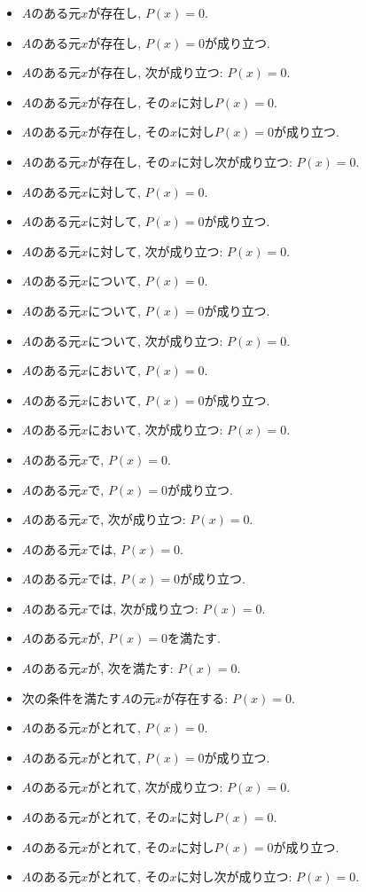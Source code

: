 \documentclass[a4paper,12pt,draft]{amsart}
\begin{document}
\begin{itemize}
\item $A$のある元$x$が存在し, $P(x)=0$.
\item $A$のある元$x$が存在し, $P(x)=0$が成り立つ.
\item $A$のある元$x$が存在し, 次が成り立つ: $P(x)=0$.
\item $A$のある元$x$が存在し, その$x$に対し$P(x)=0$.
\item $A$のある元$x$が存在し, その$x$に対し$P(x)=0$が成り立つ.
\item $A$のある元$x$が存在し, その$x$に対し次が成り立つ: $P(x)=0$.
\item $A$のある元$x$に対して, $P(x)=0$.
\item $A$のある元$x$に対して, $P(x)=0$が成り立つ.
\item $A$のある元$x$に対して, 次が成り立つ: $P(x)=0$.
\item $A$のある元$x$について, $P(x)=0$.
\item $A$のある元$x$について, $P(x)=0$が成り立つ.
\item $A$のある元$x$について, 次が成り立つ: $P(x)=0$.
\item $A$のある元$x$において, $P(x)=0$.
\item $A$のある元$x$において, $P(x)=0$が成り立つ.
\item $A$のある元$x$において, 次が成り立つ: $P(x)=0$.
\item $A$のある元$x$で, $P(x)=0$.
\item $A$のある元$x$で, $P(x)=0$が成り立つ.
\item $A$のある元$x$で, 次が成り立つ: $P(x)=0$.
\item $A$のある元$x$では, $P(x)=0$.
\item $A$のある元$x$では, $P(x)=0$が成り立つ.
\item $A$のある元$x$では, 次が成り立つ: $P(x)=0$.
\item $A$のある元$x$が, $P(x)=0$を満たす.
\item $A$のある元$x$が, 次を満たす: $P(x)=0$.
\item 次の条件を満たす$A$の元$x$が存在する: $P(x)=0$.
\item $A$のある元$x$がとれて, $P(x)=0$.
\item $A$のある元$x$がとれて, $P(x)=0$が成り立つ.
\item $A$のある元$x$がとれて, 次が成り立つ: $P(x)=0$.
\item $A$のある元$x$がとれて, その$x$に対し$P(x)=0$.
\item $A$のある元$x$がとれて, その$x$に対し$P(x)=0$が成り立つ.
\item $A$のある元$x$がとれて, その$x$に対し次が成り立つ: $P(x)=0$.
\end{itemize}
\end{document}
